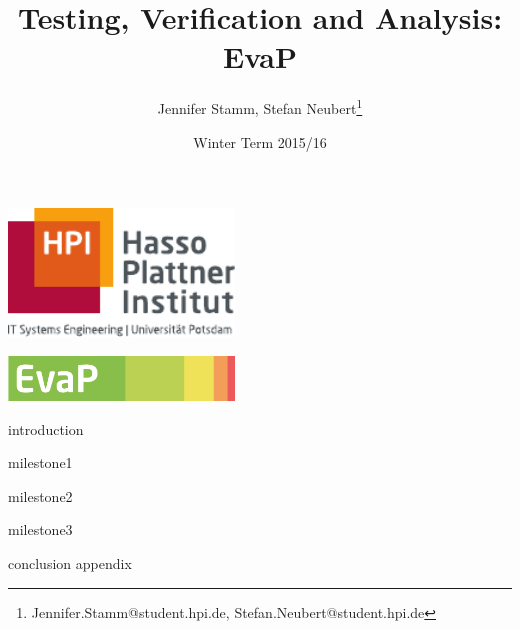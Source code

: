 \documentclass[12pt,a4paper]{scrartcl}
\title{Testing, Verification and Analysis: EvaP}
\author{Jennifer Stamm, Stefan Neubert\thanks{Jennifer.Stamm@student.hpi.de, Stefan.Neubert@student.hpi.de}}
\date{Winter Term 2015/16}
\begin{document}
	\begin{titlepage}
		\maketitle
		\centering
		\includegraphics[width=6cm]{graphics/hpi-logo}
		
		\bigskip
		
		\includegraphics[width=6cm]{graphics/evap}
	\end{titlepage}
	\setcounter{section}{-1}
	\tableofcontents
	
	\clearpage
	
	{introduction}

	{milestone1}

	{milestone2}

	{milestone3}

	{conclusion}
	\clearpage
	{appendix}
\end{document}
